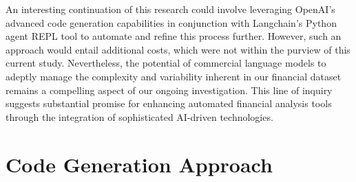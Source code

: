 \documentclass[logo,msc]{infthesis}           %
\begin{document}
An interesting continuation of this research could involve leveraging OpenAI's advanced code generation capabilities in conjunction with Langchain's Python agent REPL tool to automate and refine this process further. However, such an approach would entail additional costs, which were not within the purview of this current study. Nevertheless, the potential of commercial language models to adeptly manage the complexity and variability inherent in our financial dataset remains a compelling aspect of our ongoing investigation. This line of inquiry suggests substantial promise for enhancing automated financial analysis tools through the integration of sophisticated AI-driven technologies.

\section{Code Generation Approach}
\label{sec5.4}
\end{document}
